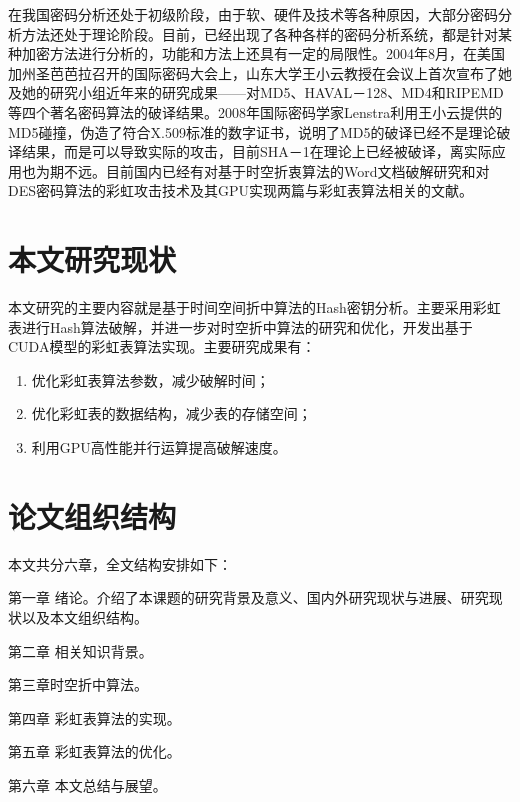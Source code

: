 在我国密码分析还处于初级阶段，由于软、硬件及技术等各种原因，大部分密码分析方法还处于理论阶段。目前，已经出现了各种各样的密码分析系统，都是针对某种加密方法进行分析的，功能和方法上还具有一定的局限性。2004年8月，在美国加州圣芭芭拉召开的国际密码大会上，山东大学王小云教授在会议上首次宣布了她及她的研究小组近年来的研究成果——对MD5、HAVAL－128、MD4和RIPEMD等四个著名密码算法的破译结果。2008年国际密码学家Lenstra利用王小云提供的MD5碰撞，伪造了符合X.509标准的数字证书，说明了MD5的破译已经不是理论破译结果，而是可以导致实际的攻击，目前SHA－1在理论上已经被破译，离实际应用也为期不远。目前国内已经有对基于时空折衷算法的Word文档破解研究\cite{word}和对DES密码算法的彩虹攻击技术及其GPU实现\cite{des}两篇与彩虹表算法相关的文献。
\section{本文研究现状}
本文研究的主要内容就是基于时间空间折中算法的Hash密钥分析。主要采用彩虹表进行Hash算法破解，并进一步对时空折中算法的研究和优化，开发出基于CUDA\cite{nvidia}模型的彩虹表算法实现。主要研究成果有：
\begin{enumerate}
\item 优化彩虹表算法参数，减少破解时间；
\item 优化彩虹表的数据结构，减少表的存储空间；
\item 利用GPU高性能并行运算提高破解速度。
\end{enumerate}
\section{论文组织结构}
本文共分六章，全文结构安排如下：

第一章 \quad 绪论。介绍了本课题的研究背景及意义、国内外研究现状与进展、研究现状以及本文组织结构。

第二章 \quad 相关知识背景。

第三章\quad  时空折中算法。

第四章 \quad 彩虹表算法的实现。

第五章 \quad 彩虹表算法的优化。

第六章 \quad 本文总结与展望。



